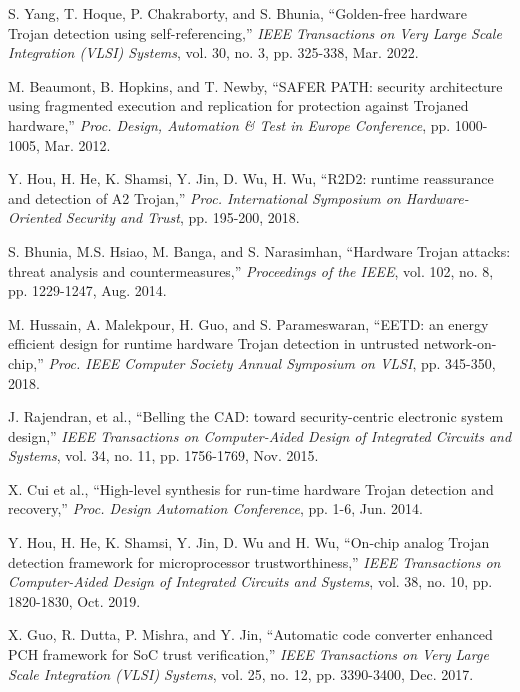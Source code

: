 \documentclass[10pt,journal]{IEEEtran}
\begin{document}
\begin{thebibliography}{99}
S. Yang, T. Hoque, P. Chakraborty, and S. Bhunia, ``Golden-free hardware Trojan detection using self-referencing,'' \textit{IEEE Transactions on Very Large Scale Integration (VLSI) Systems}, vol. 30, no. 3, pp. 325-338, Mar. 2022.


M. Beaumont, B. Hopkins, and T. Newby, ``SAFER PATH: security architecture using fragmented execution and replication for protection against Trojaned hardware,'' \textit{Proc. Design, Automation \& Test in Europe Conference}, pp. 1000-1005, Mar. 2012.

Y. Hou, H. He, K. Shamsi, Y. Jin, D. Wu, H. Wu, ``R2D2: runtime reassurance and detection of A2 Trojan,'' \textit{Proc. International Symposium on Hardware-Oriented Security and Trust}, pp. 195-200, 2018.


S. Bhunia, M.S. Hsiao, M. Banga, and S. Narasimhan, ``Hardware Trojan attacks: threat analysis and countermeasures,'' \textit{Proceedings of the IEEE}, vol. 102, no. 8, pp. 1229-1247, Aug. 2014.



M. Hussain, A. Malekpour, H. Guo, and S. Parameswaran, ``EETD: an energy efficient design for runtime hardware Trojan detection in untrusted network-on-chip,'' \textit{Proc. IEEE Computer Society Annual Symposium on VLSI}, pp. 345-350, 2018.

J. Rajendran, et al., ``Belling the CAD: toward security-centric electronic system design,'' \textit{IEEE Transactions on Computer-Aided Design of Integrated Circuits and Systems}, vol. 34, no. 11, pp. 1756-1769, Nov. 2015.

X. Cui et al., ``High-level synthesis for run-time hardware Trojan detection and recovery,'' \textit{Proc. Design Automation Conference}, pp. 1-6, Jun. 2014.

Y. Hou, H. He, K. Shamsi, Y. Jin, D. Wu and H. Wu, ``On-chip analog Trojan detection framework for microprocessor trustworthiness,'' \textit{IEEE Transactions on Computer-Aided Design of Integrated Circuits and Systems}, vol. 38, no. 10, pp. 1820-1830, Oct. 2019.

X. Guo, R. Dutta, P. Mishra, and Y. Jin, ``Automatic code converter enhanced PCH framework for SoC trust verification,'' \textit{IEEE Transactions on Very Large Scale Integration (VLSI) Systems}, vol. 25, no. 12, pp. 3390-3400, Dec. 2017.


\end{thebibliography}
\end{document}

